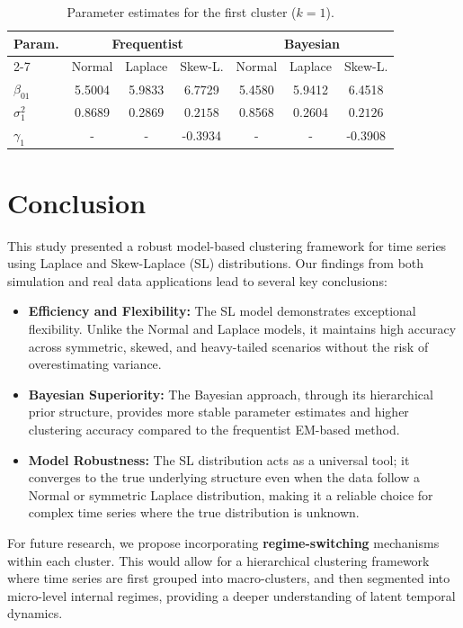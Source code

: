 \documentclass[twoside]{article}
\begin{document}
\begin{table}[ht]
\centering
\caption{Parameter estimates for the first cluster ($k=1$).}
\label{tab:parameter_estimates}
\footnotesize
\begin{tabular}{lcccccc}
\hline
\multirow{2}{*}{Param.} & \multicolumn{3}{c}{Frequentist} & \multicolumn{3}{c}{Bayesian} \\
\cline{2-7}
 & Normal & Laplace & Skew-L. & Normal & Laplace & Skew-L. \\
\hline
$\beta_{01}$ & 5.5004 & 5.9833 & 6.7729 & 5.4580 & 5.9412 & 6.4518 \\
$\sigma_{1}^2$ & 0.8689 & 0.2869 & $\mathbf{0.2158}$ & 0.8568 & 0.2604 & $\mathbf{0.2126}$ \\
$\gamma_1$ & - & - & -0.3934 & - & - & -0.3908 \\
\hline
\end{tabular}
\end{table}


\section{Conclusion}
This study presented a robust model-based clustering framework for time series using Laplace and Skew-Laplace (SL) distributions. Our findings from both simulation and real data applications lead to several key conclusions:
\begin{itemize}
    \item \textbf{Efficiency and Flexibility:} The SL model demonstrates exceptional flexibility. Unlike the Normal and Laplace models, it maintains high accuracy across symmetric, skewed, and heavy-tailed scenarios without the risk of overestimating variance.
    \item \textbf{Bayesian Superiority:} The Bayesian approach, through its hierarchical prior structure, provides more stable parameter estimates and higher clustering accuracy compared to the frequentist EM-based method.
    \item \textbf{Model Robustness:} The SL distribution acts as a universal tool; it converges to the true underlying structure even when the data follow a Normal or symmetric Laplace distribution, making it a reliable choice for complex time series where the true distribution is unknown.
\end{itemize}
For future research, we propose incorporating \textbf{regime-switching} mechanisms within each cluster. This would allow for a hierarchical clustering framework where time series are first grouped into macro-clusters, and then segmented into micro-level internal regimes, providing a deeper understanding of latent temporal dynamics.
\end{document}
